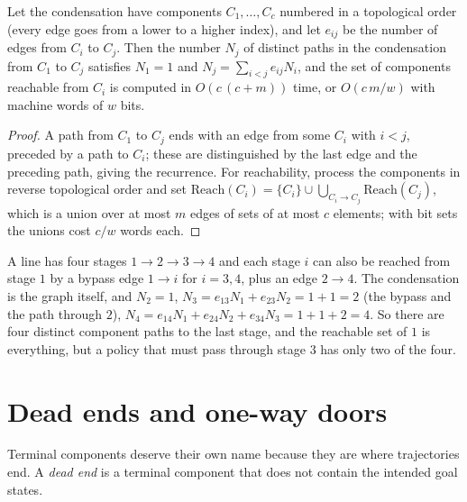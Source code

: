 \begin{newresult}\label{prop:dag-count}
Let the condensation have components $C_1,\dots,C_c$ numbered in a topological order (every edge goes from a lower to a higher index), and let $e_{ij}$ be the number of edges from $C_i$ to $C_j$. Then the number $N_j$ of distinct paths in the condensation from $C_1$ to $C_j$ satisfies $N_1=1$ and $N_j=\sum_{i<j}e_{ij}N_i$, and the set of components reachable from $C_i$ is computed in $O(c\,(c+m))$ time, or $O(c\,m/w)$ with machine words of $w$ bits.
\end{newresult}
\begin{proof}
A path from $C_1$ to $C_j$ ends with an edge from some $C_i$ with $i<j$, preceded by a path to $C_i$; these are distinguished by the last edge and the preceding path, giving the recurrence. For reachability, process the components in reverse topological order and set $\mathrm{Reach}(C_i)=\{C_i\}\cup\bigcup_{C_i\to C_j}\mathrm{Reach}(C_j)$, which is a union over at most $m$ edges of sets of at most $c$ elements; with bit sets the unions cost $c/w$ words each.
\end{proof}

\begin{example}[A funnel]\label{ex:funnel}
A line has four stages $1\to2\to3\to4$ and each stage $i$ can also be reached from stage $1$ by a bypass edge $1\to i$ for $i=3,4$, plus an edge $2\to4$. The condensation is the graph itself, and $N_2=1$, $N_3=e_{13}N_1+e_{23}N_2=1+1=2$ (the bypass and the path through $2$), $N_4=e_{14}N_1+e_{24}N_2+e_{34}N_3=1+1+2=4$. So there are four distinct component paths to the last stage, and the reachable set of $1$ is everything, but a policy that must pass through stage $3$ has only two of the four.
\end{example}

\section{Dead ends and one-way doors}\label{sec:deadends}

Terminal components deserve their own name because they are where trajectories end. A \emph{dead end} is a terminal component that does not contain the intended goal states.

